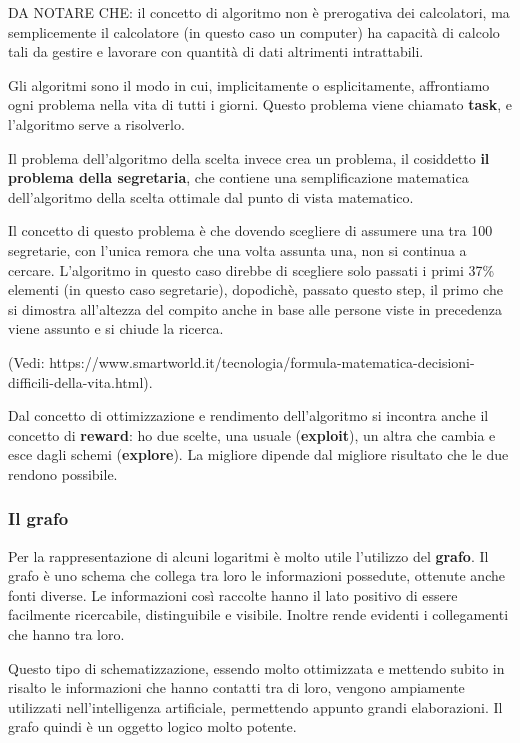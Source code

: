 \documentclass[
]{article}
\begin{document}
DA NOTARE CHE: il concetto di algoritmo non è prerogativa dei
calcolatori, ma semplicemente il calcolatore (in questo caso un
computer) ha capacità di calcolo tali da gestire e lavorare con quantità
di dati altrimenti intrattabili.

Gli algoritmi sono il modo in cui, implicitamente o esplicitamente,
affrontiamo ogni problema nella vita di tutti i giorni. Questo problema
viene chiamato \textbf{task}, e l'algoritmo serve a risolverlo.

Il problema dell'algoritmo della scelta invece crea un problema, il
cosiddetto \textbf{il problema della segretaria}, che contiene una
semplificazione matematica dell'algoritmo della scelta ottimale dal
punto di vista matematico.

Il concetto di questo problema è che dovendo scegliere di assumere una
tra 100 segretarie, con l'unica remora che una volta assunta una, non si
continua a cercare. L'algoritmo in questo caso direbbe di scegliere solo
passati i primi 37\% elementi (in questo caso segretarie), dopodichè,
passato questo step, il primo che si dimostra all'altezza del compito
anche in base alle persone viste in precedenza viene assunto e si chiude
la ricerca.

(Vedi:
https://www.smartworld.it/tecnologia/formula-matematica-decisioni-difficili-della-vita.html).

Dal concetto di ottimizzazione e rendimento dell'algoritmo si incontra
anche il concetto di \textbf{reward}: ho due scelte, una usuale
(\textbf{exploit}), un altra che cambia e esce dagli schemi
(\textbf{explore}). La migliore dipende dal migliore risultato che le
due rendono possibile.

\hypertarget{header-n24}{%
\subsubsection{Il grafo}\label{header-n24}}

Per la rappresentazione di alcuni logaritmi è molto utile l'utilizzo del
\textbf{grafo}. Il grafo è uno schema che collega tra loro le
informazioni possedute, ottenute anche fonti diverse. Le informazioni
così raccolte hanno il lato positivo di essere facilmente ricercabile,
distinguibile e visibile. Inoltre rende evidenti i collegamenti che
hanno tra loro.

Questo tipo di schematizzazione, essendo molto ottimizzata e mettendo
subito in risalto le informazioni che hanno contatti tra di loro,
vengono ampiamente utilizzati nell'intelligenza artificiale, permettendo
appunto grandi elaborazioni. Il grafo quindi è un oggetto logico molto
potente.
\end{document}
